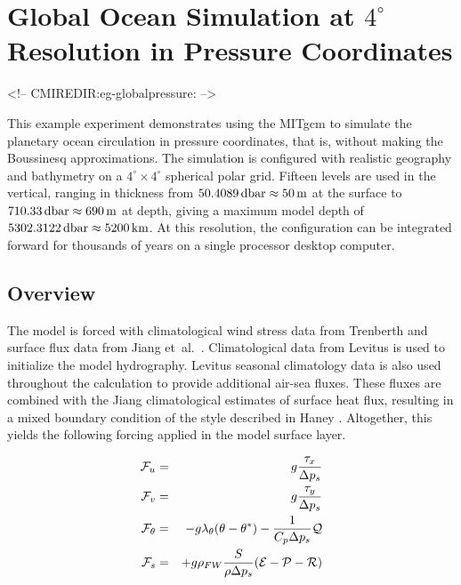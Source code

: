 
\section[P coordinate Global Ocean MITgcm Example]{Global Ocean Simulation at $4^\circ$ Resolution in Pressure
  Coordinates}
\label{www:tutorials}
\label{sect:eg-globalpressure}
\begin{rawhtml}
<!-- CMIREDIR:eg-globalpressure: -->
\end{rawhtml}


This example experiment demonstrates using the MITgcm to simulate the
planetary ocean circulation in pressure coordinates, that is, without
making the Boussinesq approximations. The simulation is configured
with realistic geography and bathymetry on a $4^{\circ} \times
4^{\circ}$ spherical polar grid.  Fifteen levels are used in the
vertical, ranging in thickness from
$50.4089\mbox{\,dbar}\approx50\mbox{\,m}$ at the surface to
$710.33\mbox{\,dbar}\approx690\mbox{\,m}$ at depth, giving a maximum
model depth of $5302.3122\mbox{\,dbar}\approx5200\mbox{\,km}$.  At
this resolution, the configuration can be integrated forward for
thousands of years on a single processor desktop computer.


\subsection{Overview}
\label{www:tutorials}

The model is forced with climatological wind stress data from
Trenberth \cite{trenberth90} and surface flux data from Jiang et~al.\ 
\cite{jiang99}. Climatological data from Levitus \cite{Levitus94} is
used to initialize the model hydrography.  Levitus seasonal
climatology data is also used throughout the calculation to provide
additional air-sea fluxes.  These fluxes are combined with the Jiang
climatological estimates of surface heat flux, resulting in a mixed
boundary condition of the style described in Haney \cite{Haney}.
Altogether, this yields the following forcing applied in the model
surface layer.

\begin{eqnarray}
\label{EQ:eg-global_forcing_pcoord}
\label{EQ:eg-global_forcing_fu_pcoord}
{\cal F}_{u} & = & g\frac{\tau_{x}}{\Delta p_{s}}
\\
\label{EQ:eg-global_forcing_fv_pcoord}
{\cal F}_{v} & = & g\frac{\tau_{y}}{\Delta p_{s}}
\\
\label{EQ:eg-global_forcing_ft_pcoord}
{\cal F}_{\theta} & = & - g\lambda_{\theta} ( \theta - \theta^{\ast} ) 
 - \frac{1}{C_{p} \Delta p_{s}}{\cal Q}
\\
\label{EQ:eg-global_forcing_fs_pcoord}
{\cal F}_{s} & = &
 + g\rho_{FW}\frac{S}{\rho\Delta p_{s}}({\cal E} - {\cal P} - {\cal R})
\end{eqnarray}

